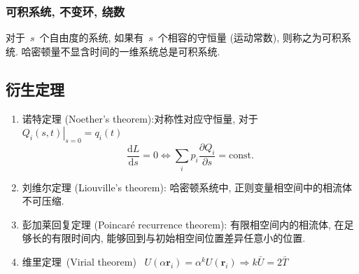 \documentclass[11pt,a4paper]{article}%
\renewcommand*{\vec}[1]{\bm{#1}}%
\newcommand{\dif}{\mathrm{d}}
\renewcommand{\[}{~$\displaystyle}
\renewcommand{\]}{$~}%
\newcommand{\pard}[2]{\ensuremath{\frac{\partial #1}{\partial #2}}}
\begin{document}
  \subsubsection{可积系统, 不变环, 绕数}
  对于\[s\]个自由度的系统, 如果有\[s\]个相容的守恒量 (运动常数), 则称之为可积系统. 哈密顿量不显含时间的一维系统总是可积系统.

\subsection{衍生定理}
\begin{enumerate}
  \item 诺特定理 (Noether's theorem):对称性对应守恒量, 对于\[\left. Q_i(s,t)\right|_{s=0} = q_i(t)\]
  	$$\frac{\dif L}{\dif s} = 0 \Leftrightarrow \sum_i p_i\pard{Q_i}{s} = \mbox{const.}$$
  \item 刘维尔定理 (Liouville's theorem): 哈密顿系统中, 正则变量相空间中的相流体不可压缩. 
  \item 彭加莱回复定理 (Poincaré recurrence theorem): 有限相空间内的相流体, 在足够长的有限时间内, 能够回到与初始相空间位置差异任意小的位置. 
  \item 维里定理~(Virial theorem) \[U(\alpha \vec{r}_i) = \alpha^k U(\vec{r}_i) \Rightarrow k\bar{U} = 2\bar{T}\]
\end{enumerate}
\end{document}
